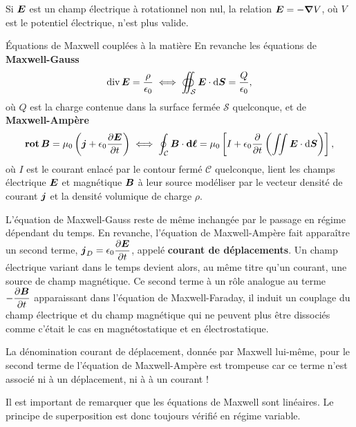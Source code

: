 \begin{attention}
	Si $\vece$ est un champ électrique à rotationnel non nul, la relation 
	$\vece = - \grad V$, où $V$ est le potentiel électrique, n'est plus valide.
\end{attention}

\begin{defn}{Équations de Maxwell couplées à la matière}
	En revanche les équations de \textbf{Maxwell-Gauss}
	\begin{equation}
		\div \vece = \dfrac{\rho}{\epsilon_0} \iff \oiint_\mathcal{S}
		\vece \cdot \ds = \dfrac{Q}{\epsilon_0}, 
	\end{equation}
	où $Q$ est la charge contenue dans la surface fermée $\mathcal{S}$ quelconque, 
	et de \textbf{Maxwell-Ampère} 
	\begin{equation}
		\rot \vecb = \mu_0\left(\vecj + \epsilon_0 \dd{\vece}{t}\right)
		\iff \oint_\mathcal{C} \vecb \cdot \dl = \mu_0 \left[
		I + \epsilon_0 \dfrac{\partial}{\partial t} 
		\left(\iint \vece \cdot \ds\right)
	\right],
	\end{equation}
	où $I$ est le courant enlacé par le contour fermé $\mathcal{C}$ quelconque, 
	lient les champs électrique $\vece$ et magnétique $\vecb$ à leur source 
	modéliser par le vecteur densité
	de courant $\vecj$ et la densité volumique de charge $\rho$. 
\end{defn}

L'équation de Maxwell-Gauss reste de même inchangée par le passage en régime
dépendant du temps. En revanche, l'équation de Maxwell-Ampère fait apparaître un
second terme, $\vecj_D = \epsilon_0 \dd{\vece}{t}$, appelé \textbf{courant de
déplacements}. Un champ électrique variant dans le temps devient alors, au même
titre qu'un courant, une source de champ magnétique. Ce second terme à un rôle
analogue au terme $- \dd{\vecb}{t}$ apparaissant dans l'équation de 
Maxwell-Faraday, il induit un couplage du champ électrique et du champ magnétique
qui ne peuvent plus être dissociés comme c'était le cas en magnétostatique
et en électrostatique.

\begin{attention}
	La dénomination courant de déplacement,
	donnée par Maxwell lui-même, 
	pour le second terme de l'équation de Maxwell-Ampère est trompeuse
	car ce terme n'est associé ni à un déplacement, ni à à un courant !
\end{attention}

Il est important de remarquer que les équations de Maxwell sont linéaires.
Le principe de superposition est donc toujours vérifié en régime variable. 


